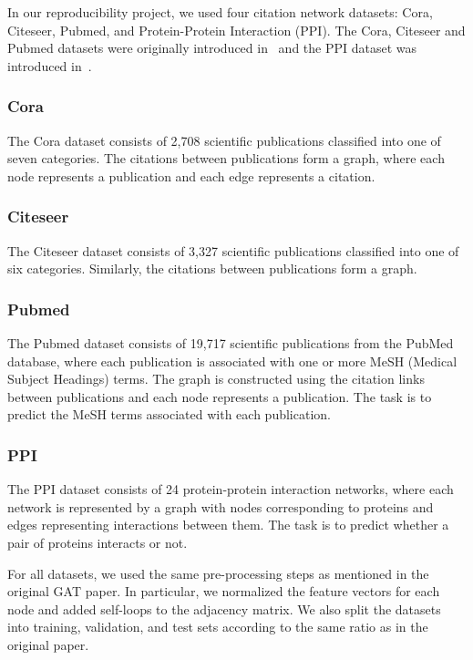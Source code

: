
In our reproducibility project, we used four citation network datasets: Cora, Citeseer, Pubmed, and Protein-Protein Interaction (PPI).
The Cora, Citeseer and Pubmed datasets were originally introduced in~\cite{sen2008collective} and the PPI dataset was
introduced in~\cite{hamilton2017inductive}.

\subsubsection{Cora}
The Cora dataset consists of 2,708 scientific publications classified into one of seven categories.
The citations between publications form a graph, where each node represents a publication and each edge represents a citation.

\subsubsection{Citeseer}
The Citeseer dataset consists of 3,327 scientific publications classified into one of six categories.
Similarly, the citations between publications form a graph.

\subsubsection{Pubmed}
The Pubmed dataset consists of 19,717 scientific publications from the PubMed database, where each publication is associated with one or more MeSH (Medical Subject Headings) terms.
The graph is constructed using the citation links between publications and each node represents a publication.
The task is to predict the MeSH terms associated with each publication.

\subsubsection{PPI}
The PPI dataset consists of 24 protein-protein interaction networks, where each network is represented by a graph with nodes corresponding to proteins and edges representing interactions between them.
The task is to predict whether a pair of proteins interacts or not.

For all datasets, we used the same pre-processing steps as mentioned in the original GAT paper.
In particular, we normalized the feature vectors for each node and added self-loops to the adjacency matrix.
We also split the datasets into training, validation, and test sets according to the same ratio as in the original paper.

